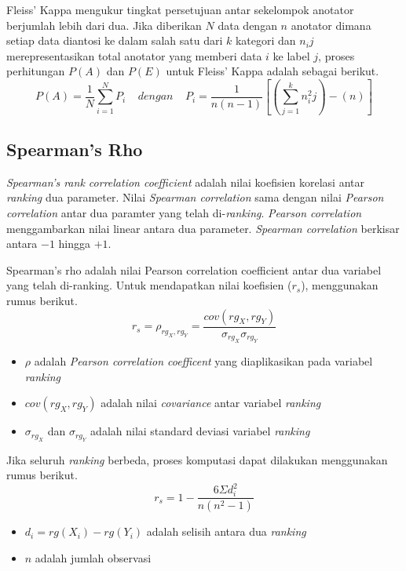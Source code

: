 Fleiss' Kappa mengukur tingkat persetujuan antar sekelompok anotator berjumlah lebih dari dua. Jika diberikan $N$ data dengan $n$ anotator dimana setiap data diantosi ke dalam salah satu dari $k$ kategori dan $n_ij$ merepresentasikan total anotator yang memberi data $i$ ke label $j$, proses perhitungan $P(A)$ dan $P(E)$ untuk Fleiss' Kappa adalah sebagai berikut.
\[ P(A)=\frac{1}{N}\sum_{i=1}^{N}P_i \:\:\:\:\:dengan\:\:\:\:\: P_i=\frac{1}{n(n-1)}[(\sum_{j=1}^{k}n^2_ij)-(n)] \]

\subsection{Spearman's Rho}
\textit{Spearman's rank correlation coefficient} adalah nilai koefisien korelasi antar \textit{ranking} dua parameter. Nilai \textit{Spearman correlation} sama dengan nilai \textit{Pearson correlation} antar dua paramter yang telah di-\textit{ranking}. \textit{Pearson correlation}  menggambarkan nilai linear antara dua parameter. \textit{Spearman correlation} berkisar antara $-1$ hingga $+1$.

Spearman's rho adalah nilai Pearson correlation coefficient antar dua variabel yang telah di-ranking. Untuk mendapatkan nilai koefisien ($r_s$), menggunakan rumus berikut.
\[ r_s = \rho_{rg_X,rg_Y} = \frac{cov(rg_X,rg_Y)}{\sigma_{rg_X}\sigma_{rg_Y}} \]
\begin{itemize}
  \item $\rho$ adalah \textit{Pearson correlation coefficent} yang diaplikasikan pada variabel \textit{ranking}
  \item $cov(rg_X,rg_Y)$ adalah nilai \textit{covariance} antar variabel \textit{ranking}
  \item $\sigma_{rg_X}$ dan $\sigma_{rg_Y}$ adalah nilai standard deviasi variabel \textit{ranking}
\end{itemize}
Jika seluruh \textit{ranking} berbeda, proses komputasi dapat dilakukan menggunakan rumus berikut.
\[ r_s = 1-\frac{6 \Sigma d_i^2}{n(n^2-1)} \]
\begin{itemize}
  \item $d_i = rg(X_i)-rg(Y_i)$ adalah selisih antara dua \textit{ranking}
  \item $n$ adalah jumlah observasi
\end{itemize}
